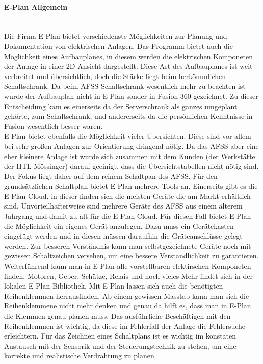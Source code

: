     \paragraph{E-Plan Allgemein}\mbox{}\\
    Die Firma E-Plan bietet verschiedenste Möglichkeiten zur Planung und Dokumentation von elektrischen Anlagen. Das Programm bietet auch die Möglichkeit eines Aufbauplanes, in diesem werden die elektrischen Komponeten der Anlage in einer 2D-Ansicht dargestellt. Diese Art des Aufbauplanes ist weit verbreitet und übersichtlich, doch die Stärke liegt beim herkömmlichen Schaltschrank. Da beim AFSS-Schaltschrank wesentlich mehr zu beachten ist wurde der Aufbauplan nicht in E-Plan sonder in Fusion 360 gezeichnet. Zu dieser Entscheidung kam es einerseits da der Serverschrank als ganzes umgeplant gehörte, zum Schaltschrank, und andererseits da die persönlichen Kenntnisse in Fusion wesentlich besser waren.\\
    E-Plan bietet ebenfalls die Möglichkeit vieler Übersichten. Diese sind vor allem bei sehr großen Anlagen zur Orientierung dringend nötig. Da das AFSS aber eine eher kleinere Anlage ist wurde sich zusammen mit dem Kunden (der Werkstätte der HTL-Mössinger) darauf geeinigt, dass die Übersichtstabellen nicht nötig sind.\\
    Der Fokus liegt daher auf dem reinem Schaltpan des AFSS. Für den grundsätzlichen Schaltplan bietet E-Plan mehrere Tools an. Einerseits gibt es die E-Plan Cloud, in dieser finden sich die meisten Geräte die am Markt erhältlich sind. Unvorteilhafterweise sind mehrere Geräte des AFSS aus einem älterem Jahrgang und damit zu alt für die E-Plan Cloud. Für diesen Fall bietet E-Plan die Möglichkeit ein eigenes Gerät anzulegen. Dazu muss ein Gerätekasten eingefügt werden und in diesen müssen daraufhin die Gräteanschlüsse gelegt werden. Zur besseren Verständnis kann man selbstgezeichnete Geräte noch mit gewissen Schaltzeichen versehen, um eine bessere Verständlichkeit zu garantieren. Weiterführend kann man in E-Plan alle vorstellbaren elektirschen Komponeten finden. Motoren, Geber, Schütze, Relais und noch vieles Mehr findet sich in der lokalen E-Plan Bibliothek. Mit E-Plan lassen sich auch die benötigten Reihenklemmen herrausfinden. Ab einem gewissen Masstab kann man sich die Reihenklemmene nicht mehr denken und genau da hilft es, dass man in E-Plan die Klemmen genau planen muss. Das ausführliche Beschäftigen mit den Reihenklemmen ist wichtig, da diese im Fehlerfall der Anlage die Fehlersuche erleichtern. Für das Zeichnen eines Schaltplans ist es wichtig im konstaten Austausch mit der Sensorik und der Steuerungstechnik zu stehen, um eine korrekte und realistische Verdrahtung zu planen.\\
